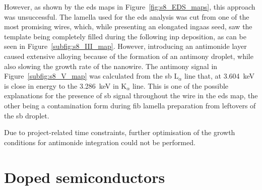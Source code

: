 However, as shown by the \acs{eds} maps in Figure~\ref{fig:s8_EDS_maps}, this approach was unsuccessful. The lamella used for the \acs{eds} analysis was cut from one of the most promising wires, which, while presenting an elongated \acs{ingaas} seed, saw the template being completely filled during the following \acs{inp} deposition, as can be seen in Figure~\ref{subfig:s8_III_map}. However, introducing an antimonide layer caused extensive alloying because of the formation of an antimony droplet, while also slowing the growth rate of the nanowire. The antimony signal in Figure~\ref{subfig:s8_V_map} was calculated from the \acl{sb} L\(_\alpha\) line that, at \qty{3.604}{\kilo\eV} is close in energy to the \qty{3.286}{\kilo\eV} \acl{in} K\(_\alpha\) line. This is one of the possible explanations for the presence of \acl{sb} signal throughout the wire in the \acs{eds} map, the other being a contamination form during \acs{fib} lamella preparation from leftovers of the \acl{sb} droplet.

Due to project-related time constraints, further optimisation of the growth conditions for antimonide integration could not be performed.

\section{Doped semiconductors}

